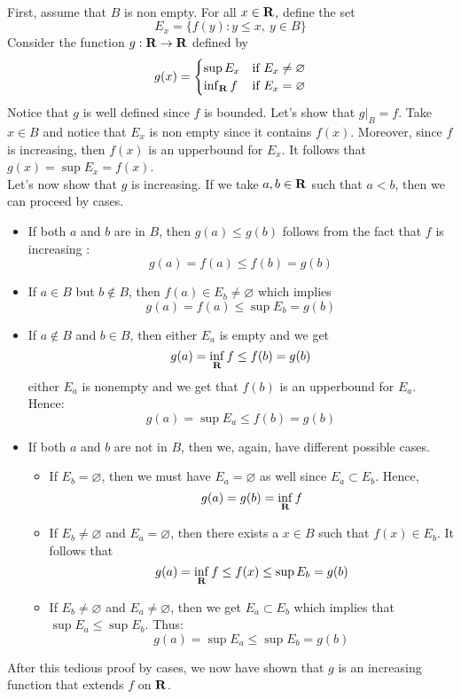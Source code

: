 \begin{solution}
    \\ First, assume that $B$ is non empty. For all $x \in \mathbf{R}$, define the set 
    $$E_x = \{f(y) : y \leq x, \ y \in B \}$$
    Consider the function $g : \mathbf{R} \to \mathbf{R}$ defined by
    $$g(x) = \begin{cases}
        \sup E_x & \text{if } E_x \neq \varnothing \\
        \inf_{\mathbf{R}}f & \text{if  } E_x = \varnothing
    \end{cases}$$
    Notice that $g$ is well defined since $f$ is bounded. Let's show that $g|_B = f$. Take $x \in B$ and notice that $E_x$ is non empty since it contains $f(x)$. Moreover, since $f$ is increasing, then $f(x)$ is an upperbound for $E_x$. It follows that $g(x) = \sup E_x = f(x)$. \\
    Let's now show that $g$ is increasing. If we take $a,b \in \mathbf{R}$ such that $a < b$, then we can proceed by cases. 
    \begin{itemize}
        \item If both $a$ and $b$ are in $B$, then $g(a) \leq g(b)$ follows from the fact that $f$ is increasing :
        $$g(a) = f(a) \leq f(b) = g(b)$$

        \item If $a \in B$ but $b \notin B$, then $f(a) \in E_b \neq \varnothing$ which implies
        $$g(a) = f(a) \leq \sup E_b = g(b)$$
        
        \item If $a \notin B$ and $b \in B$, then either $E_a$ is empty and we get
         $$g(a) = \inf_{\mathbf{R}}f \leq f(b) = g(b)$$
        either $E_a$ is nonempty and we get that $f(b)$ is an upperbound for $E_a$. Hence:
        $$g(a) = \sup E_a \leq f(b) = g(b)$$
        
        \item If both $a$ and $b$ are not in $B$, then we, again, have different possible cases.
        \begin{itemize}
            \item If $E_b = \varnothing$, then we must have $E_a = \varnothing$ as well since $E_a \subset E_b$. Hence,
            $$g(a) = g(b) = \inf_{\mathbf{R}}f$$
            \item If $E_b \neq \varnothing$ and $E_a = \varnothing$, then there exists a $x \in B$ such that $f(x) \in E_b$. It follows that
            $$g(a) = \inf_{\mathbf{R}}f \leq f(x) \leq \sup E_b = g(b)$$
            \item If $E_b \neq \varnothing$ and $E_a \neq \varnothing$, then we get $E_a \subset E_b$ which implies that $\sup E_a \leq \sup E_b$. Thus:
            $$g(a) = \sup E_a \leq \sup E_b = g(b)$$
        \end{itemize}
    \end{itemize}
    After this tedious proof by cases, we now have shown that $g$ is an increasing function that extends $f$ on $\mathbf{R}$. \\
\end{solution}

